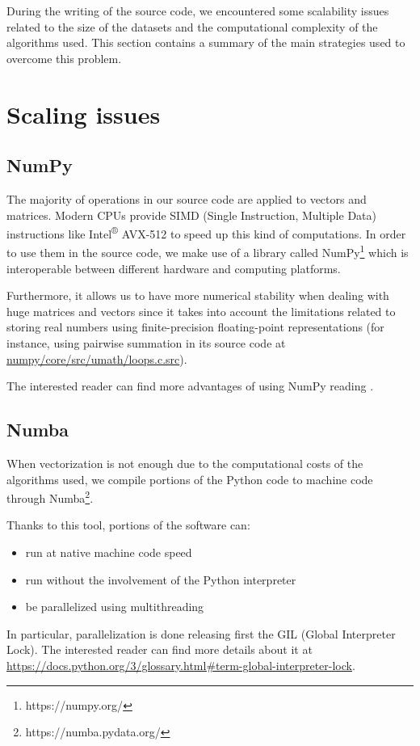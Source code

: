 During the writing of the source code, we encountered some scalability issues related to
the size of the datasets and the computational complexity of the algorithms used.
This section contains a summary of the main strategies used to overcome this
problem.

\section{Scaling issues} \label{scaling}
\subsection{NumPy}
The majority of operations in our source code are applied to vectors and matrices.
Modern CPUs provide SIMD (Single Instruction, Multiple Data) instructions like
Intel\textsuperscript{®} AVX-512 to speed up this kind of computations.
In order to use them in the source code, we make use of a library called NumPy\footnote{https://numpy.org/}
which is interoperable between different hardware and computing platforms.

Furthermore, it allows us to have more numerical stability when dealing with huge
matrices and vectors since it takes into account the limitations
related to storing real numbers using finite-precision floating-point representations
(for instance, using pairwise summation in its source code at
\href{https://github.com/numpy/numpy/blob/v1.18.1/numpy/core/src/umath/loops.c.src}{numpy/core/src/umath/loops.c.src}).

The interested reader can find more advantages of using NumPy reading \cite{5725236}.

\subsection{Numba}
When vectorization is not enough due to the computational costs of the algorithms used, we
compile portions of the Python code to machine code through Numba\footnote{https://numba.pydata.org/}.

Thanks to this tool, portions of the software can:
\begin{itemize}
    \item run at native machine code speed
    \item run without the involvement of the Python interpreter
    \item be parallelized using multithreading
\end{itemize}
In particular, parallelization is done releasing first the GIL (Global Interpreter Lock).
The interested reader can find more details about it
at \url{https://docs.python.org/3/glossary.html\#term-global-interpreter-lock}.

